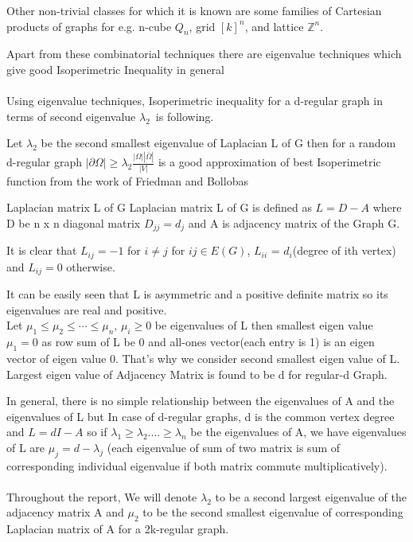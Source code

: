 \documentclass[oneside]{book}
\begin{document}
	
	
	
	
	
	
	
	
	
	
	\hfill \break
	
	Other non-trivial classes for which it is known are some families of Cartesian products of graphs for e.g. 
	n-cube $Q_{n}$, 
	grid $[k]^{n}$,
	and lattice $\mathbb{Z}^{n}$.
	\par
	Apart from these combinatorial techniques there are eigenvalue techniques which give good Isoperimetric Inequality in general \\\\
	
	Using eigenvalue techniques, 
	Isoperimetric inequality for a d-regular graph in terms of second eigenvalue $\lambda_2$\ is following. \par
	
	Let $\lambda_{2}$ be the second smallest eigenvalue of Laplacian L of G then for a random d-regular graph $|\partial \Omega| \geq \lambda_{2} \frac{|\Omega||\bar{\Omega}|}{|V|}$  is a good approximation of best Isoperimetric function from the work of Friedman and Bollobas  \par 
	
	
	{Laplacian matrix L of G }
	\label{ss:22}
	Laplacian matrix L of G is defined as  $L = D - A$ where  D be n x n diagonal matrix $D_{jj} = d_{j}$ and A is adjacency matrix of the Graph G.\par
	
	
	
	It is clear that   $L_{ij} = -1$ for $i\neq j$  for $ij\in E(G)$,  $L_{ii}$ = $d_i$(degree of ith vertex) and   $L_{ij} = 0$ otherwise.\par
	
	It can be easily seen that L is asymmetric and a positive definite  matrix so its eigenvalues are real and positive. \\
	
	Let $\mu_{1} \leq \mu_{2} \leq \cdots \leq \mu_{n}$, $\mu_{i} \geq 0$  be  eigenvalues of L then smallest eigen value $\mu_{1} = 0$ as row sum of L  be 0 and all-ones vector(each entry is 1) is an eigen vector of eigen value 0. That's why we consider second smallest eigen value of L. Largest eigen value of Adjacency Matrix is found to be d for regular-d Graph. \par
	
	
	
	
	In general, there is no simple relationship between the eigenvalues of
	A and the eigenvalues of L but In case of d-regular graphs, d is the
	common vertex degree and $L = dI - A$  so if $\lambda_{1} \geq \lambda_{2}....\geq \lambda_{n}$  be the eigenvalues of A, we have eigenvalues of L are $\mu_{j} = d - \lambda_{j}$ (each eigenvalue of sum of two matrix is sum of corresponding  individual eigenvalue if both matrix commute multiplicatively). \\\\
	Throughout the report, We will denote $\lambda_{2} $ to be a second largest eigenvalue of the adjacency matrix A and $\mu_{2}$ to be the second smallest eigenvalue of corresponding Laplacian matrix of A for a 2k-regular graph.  
	
\end{document}
